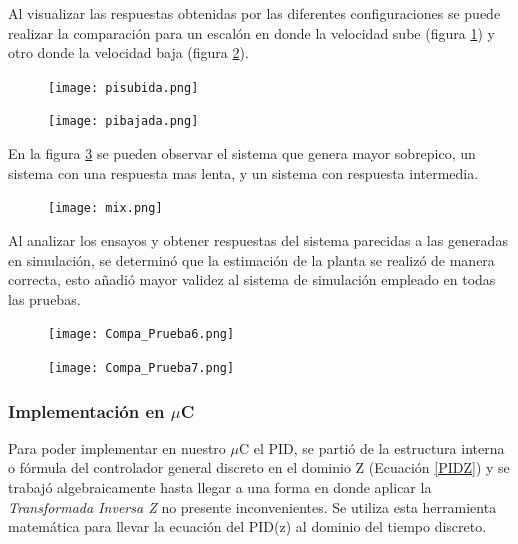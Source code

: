     Al visualizar las respuestas obtenidas por las diferentes configuraciones se puede realizar la comparación para un escalón en donde la velocidad sube (figura \ref{fig:pisubuda}) y otro donde la velocidad baja (figura \ref{fig:pibajada}).
    
    \begin{figure}[H]
    	\centering
    	\texttt{[image: pisubida.png]}
    	\label{fig:pisubuda}
    \end{figure}
    
    \begin{figure}[H]
    	\centering
    	\texttt{[image: pibajada.png]}
    	\label{fig:pibajada}
    \end{figure}
    
    
    En la figura \ref{fig:mix} se pueden observar el sistema que genera mayor sobrepico, un sistema con una respuesta mas lenta, y un sistema con respuesta intermedia. 
    \begin{figure}[H]
    	\centering
    	\texttt{[image: mix.png]}
    	\label{fig:mix}
    \end{figure}

	Al analizar los ensayos y obtener respuestas del sistema parecidas a las generadas en simulación, se determinó que la estimación de la planta se realizó de manera correcta, esto añadió mayor validez al sistema de simulación empleado en todas las pruebas. 
	
	\begin{figure}[H]
		\centering
		\texttt{[image: Compa\_Prueba6.png]}
		\label{fig:Prueba_6}
	\end{figure}   
\begin{figure}[H]
	\centering
	\texttt{[image: Compa\_Prueba7.png]}
	\label{fig:Prueba_7}
\end{figure}   
    \subsubsection{Implementación en $\mu$C}
    
    Para poder implementar en nuestro $\mu$C  el PID, se partió de la estructura interna o fórmula del controlador general discreto en el dominio Z (Ecuación \ref{PIDZ}) y se trabajó algebraicamente hasta llegar a una forma en donde aplicar la \textit{Transformada Inversa Z} no presente inconvenientes. Se utiliza esta herramienta matemática para llevar la ecuación del PID(z) al dominio del tiempo discreto.
    
